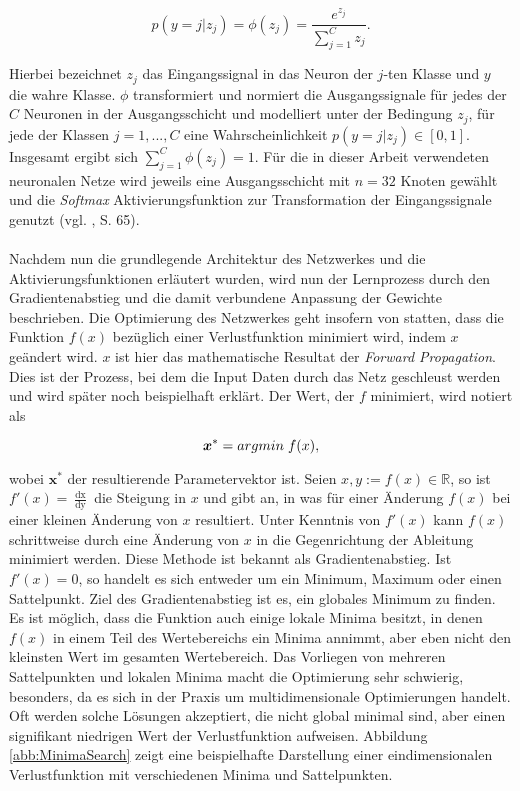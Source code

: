 \documentclass[a4paper,11pt]{article}
\begin{document}
\[p(y = j |z_j) = \phi(z_j) = \frac{e^{z_j}}{\sum_{j=1}^C z_j} .\]

Hierbei bezeichnet $z_j$ das Eingangssignal in das Neuron der $j$-ten Klasse und $y$ die wahre Klasse. $\phi$ transformiert und normiert die Ausgangssignale für jedes der $C$ Neuronen in der Ausgangsschicht und modelliert unter der Bedingung $z_j$, für jede der Klassen $j = 1,..., C$ eine Wahrscheinlichkeit $p(y=j|z_j) \in \left[0, 1\right]$. Insgesamt ergibt sich $\sum_{j = 1}^C \phi(z_j) = 1$. Für die in dieser Arbeit verwendeten neuronalen Netze wird jeweils eine Ausgangsschicht mit $n = 32$ Knoten gewählt und die \textit{Softmax} Aktivierungsfunktion zur Transformation der Eingangssignale genutzt (vgl. \cite{deepEssentials}, S. 65).\\
\\
Nachdem nun die grundlegende Architektur des Netzwerkes und die Aktivierungsfunktionen erläutert wurden, wird nun der Lernprozess durch den Gradientenabstieg und die damit verbundene Anpassung der Gewichte beschrieben. Die Optimierung des Netzwerkes geht insofern von statten, dass die Funktion $f(x)$ bezüglich einer Verlustfunktion minimiert wird, indem $x$ geändert wird. $x$ ist hier das mathematische Resultat der \textit{Forward Propagation}. Dies ist der Prozess, bei dem die Input Daten durch das Netz geschleust werden und wird später noch beispielhaft erklärt.
Der Wert, der $f$ minimiert, wird notiert als 

\[\bm{x}^\ast = argmin \hspace{0.1cm} f(x),\]

wobei $\bm{x}^\ast$ der resultierende Parametervektor ist.
Seien $x, y := f(x) \in \mathbb{R}$, so ist $f'(x) = \frac{\mathop{dx}}{\mathop{dy}}$ die Steigung in $x$ und gibt an, in was für einer Änderung $f(x)$ bei einer kleinen Änderung von $x$ resultiert. Unter Kenntnis von $f'(x)$ kann $f(x)$ schrittweise durch eine Änderung von $x$ in die Gegenrichtung der Ableitung minimiert werden. Diese Methode ist bekannt als Gradientenabstieg. Ist $f'(x) = 0$, so handelt es sich entweder um ein Minimum, Maximum oder einen Sattelpunkt. Ziel des Gradientenabstieg ist es, ein globales Minimum zu finden. Es ist möglich, dass die Funktion auch einige lokale Minima besitzt, in denen $f(x)$ in einem Teil des Wertebereichs ein Minima annimmt, aber eben nicht den kleinsten Wert im gesamten Wertebereich. Das Vorliegen von mehreren Sattelpunkten und lokalen Minima macht die Optimierung sehr schwierig, besonders, da es sich in der Praxis um multidimensionale Optimierungen handelt. Oft werden solche Lösungen akzeptiert, die nicht global minimal sind, aber einen signifikant niedrigen Wert der Verlustfunktion aufweisen. Abbildung \ref{abb:MinimaSearch} zeigt eine beispielhafte Darstellung einer eindimensionalen Verlustfunktion mit verschiedenen Minima und Sattelpunkten.
\end{document}
